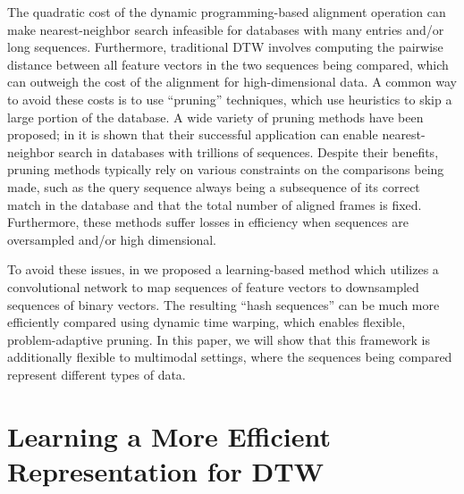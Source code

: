 \documentclass{article} %
\begin{document}
The quadratic cost of the dynamic programming-based alignment operation can make nearest-neighbor search infeasible for databases with many entries and/or long sequences.
Furthermore, traditional DTW involves computing the pairwise distance between all feature vectors in the two sequences being compared, which can outweigh the cost of the alignment for high-dimensional data.
A common way to avoid these costs is to use ``pruning'' techniques, which use heuristics to skip a large portion of the database.
A wide variety of pruning methods have been proposed; in \cite{rakthanmanon2012searching} it is shown that their successful application can enable nearest-neighbor search in databases with trillions of sequences.
Despite their benefits, pruning methods typically rely on various constraints on the comparisons being made, such as the query sequence always being a subsequence of its correct match in the database and that the total number of aligned frames is fixed.
Furthermore, these methods suffer losses in efficiency when sequences are oversampled and/or high dimensional.

To avoid these issues, in \cite{raffel2015large} we proposed a learning-based method which utilizes a convolutional network to map sequences of feature vectors to downsampled sequences of binary vectors.
The resulting ``hash sequences'' can be much more efficiently compared using dynamic time warping, which enables flexible, problem-adaptive pruning.
In this paper, we will show that this framework is additionally flexible to multimodal settings, where the sequences being compared represent different types of data.

\section{Learning a More Efficient Representation for DTW}
\end{document}
